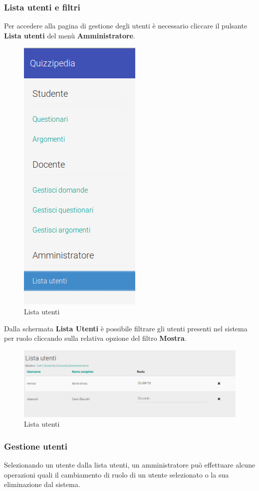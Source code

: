\documentclass[12pt,a4paper]{article}
\begin{document}
	\subsubsection{Lista utenti e filtri}
		Per accedere alla pagina di gestione degli utenti è necessario cliccare il pulsante \textbf{Lista utenti} del menù \textbf{Amministratore}.
		\begin{figure}[H]
			\centering
			\includegraphics[width=0.2\linewidth]{../img/screenshot/usersListMenu.png}
			\caption{Lista utenti}
			\label{Lista utenti}
		\end{figure}
        Dalla schermata \textbf{Lista Utenti} è possibile filtrare gli utenti presenti nel sistema per ruolo cliccando sulla relativa opzione del filtro \textbf{Mostra}.
		\begin{figure}[H]
			
			\centering
			\includegraphics[width=1.0\linewidth]{../img/screenshot/usersListCrop.png}
			\caption{Lista utenti}
			\label{Lista utenti}
		\end{figure}
	
	\subsubsection{Gestione utenti}
	Selezionando un utente dalla lista utenti, un amministratore può effettuare alcune operazioni quali il cambiamento di ruolo di un utente selezionato o la sua eliminazione dal sistema.
		
\end{document}
